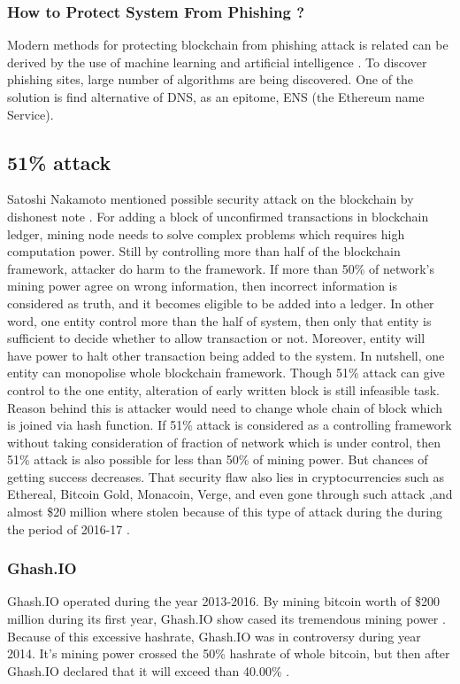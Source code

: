 \documentclass[a4paper,twoside,12pt]{report}
\begin{document}
\begin{spacing}{1.5}
\subsubsection{How to Protect System From Phishing ?}
Modern methods for protecting blockchain from phishing attack is related can be derived by the use of machine learning and artificial intelligence \cite{blockchainthreatreport,andryukhinphishing}. To discover phishing sites, large number of algorithms are being discovered. One of the solution is find alternative of DNS, as an epitome, ENS (the Ethereum name Service). 
\subsection{51\% attack}
\label{51attack}
Satoshi Nakamoto mentioned possible security attack on the blockchain by dishonest note \cite{satoshinakamoto}. For adding a block of unconfirmed transactions in blockchain ledger, mining node needs to solve complex problems which requires high computation power. Still by controlling more than half of the blockchain framework, attacker do harm to the framework. If more than 50\% of network's mining power agree on wrong information, then incorrect information is considered as truth, and it becomes eligible to be added into a ledger. In other word, one entity control more than the half of system, then only that entity is sufficient to decide whether to allow transaction or not. Moreover, entity will have power to halt other transaction being added to the system. In nutshell, one entity can monopolise whole blockchain framework. Though 51\% attack can give control to the one entity, alteration of early written block is still infeasible task. Reason behind this is attacker would need to change whole chain of block which is joined via hash function. If 51\% attack is considered as a controlling framework without taking consideration of fraction of network which is under control, then 51\% attack is also possible for less than 50\% of mining power. But chances of getting success decreases. That security flaw also lies in cryptocurrencies such as Ethereal, Bitcoin Gold, Monacoin, Verge, and even gone through such attack ,and almost \$20 million where stolen because of this type of attack during the during the period of 2016-17 \cite{topfiveblockchainsecurityissues,51attackonline}.

\subsubsection{Ghash.IO}
Ghash.IO operated during the year 2013-2016. By mining bitcoin worth of \$200 million during its first year, Ghash.IO show cased its tremendous mining power \cite{wiki:ghash.IO}. Because of this excessive hashrate, Ghash.IO was in controversy during year 2014. It's mining power crossed the 50\% hashrate of whole bitcoin, but then after Ghash.IO declared that it will exceed than 40.00\% \cite{wiki:ghash.IO}. 

\end{spacing}
\end{document}
